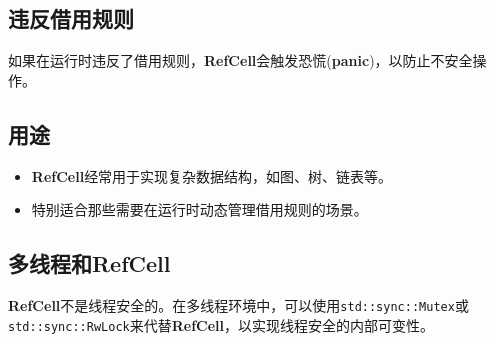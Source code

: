 \documentclass[oneside]{book}
\begin{document}
{    \subsection{违反借用规则}{
        如果在运行时违反了借用规则，\textbf{RefCell}会触发恐慌(\textbf{panic})，以防止不安全操作。
    }

    \subsection{用途}{
        \begin{itemize}
            \item \textbf{RefCell}经常用于实现复杂数据结构，如图、树、链表等。
            \item 特别适合那些需要在运行时动态管理借用规则的场景。
        \end{itemize}
    }

    \subsection{多线程和\textbf{RefCell}}{
        \textbf{RefCell}不是线程安全的。在多线程环境中，可以使用\texttt{std::sync::Mutex}或\texttt{std::sync::RwLock}来代替\textbf{RefCell}，以实现线程安全的内部可变性。
    }
}
\end{document}
